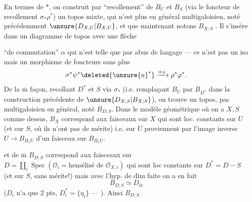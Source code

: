 En termes de $*$, on construit par ``recollement'' de $B_U$ et  $B_S$ (via le foncteur de recollement $\sigma_*\rho^*$) un topos mixte, qui n'est plus en général multigaloisien, noté précédemment $\unsure{D_{X,U}|B_{X,U}}$, et que maintenant notons $B_{X;S}$   . Il s'insère dans un diagramme de topos
avec une flèche


``de commutation'' $\alpha$ qui n'est telle que par abus de langage --- ce n'est pas un iso  mais un morphisme de foncteurs sans plus
\[
 \sigma^*\psi^*\deleted{\unsure{u}^{*}}\xrightarrow{\alpha_X}\rho^*\varphi^*.
\]
De la $\overline{\mathrm m}$ façon, recollant $D^*$ et $S$ via $\sigma_*$ (i.e. remplaçant $B_U$ par $B_{D^*}$ dans la construction précédente de $\unsure{D_{X;S}|B_{X;S}}$), on trouve un topos, pas multigaloisien en général, noté $B_{D;S}$. Dans le  modèle géométrique où on a $X,S$ comme dessus,
$B_X$ correspond aux faisceaux sur $X$ qui sont  loc. constants sur $U$ (et sur $S$, où ils n'ont pas de mérite) i.e. sur $U$ proviennent par l'image inverse  $U\longrightarrow B_{\Pi_1 U}$ d'un faisceau sur $B_{\Pi_1 U}$.

et de $\overline{\mathrm m}$ $B_{D;S}$ correspond aux faisceaux sur $D=\coprod_i\operatorname{Spec}(\mathcal O_i=\text{hensélisé de }\mathcal O_{X,i})$  qui sont loc constants sur $D^*=D-S$ (et sur $S$, sans mérite!) mais avec l'hyp. de dim faite on a en fait
\[
 B_{D;S}\simeq D_{\text{ét}}
\]
($D_i$ n'a que 2 pts, $D_i^*=\{\eta_i\}$ --- ). Ainsi $B_{D;S}$ 


